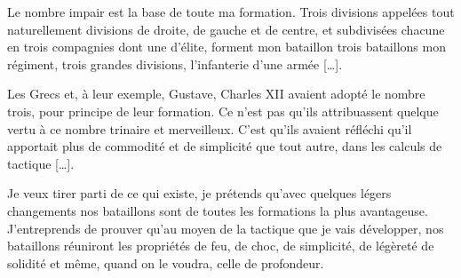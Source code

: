 \documentclass[french,twoside]{book} %
\begin{document}
Le nombre impair est la base de toute ma formation. Trois divisions appelées tout naturellement divisions de droite, de gauche et de centre, et subdivisées chacune en trois compagnies dont une d’élite, forment mon bataillon trois bataillons mon régiment, trois grandes divisions, l’infanterie d’une armée […].\par
Les Grecs et, à leur exemple, Gustave, Charles XII avaient adopté le nombre trois, pour principe de leur formation. Ce n’est pas qu’ils attribuassent quelque vertu à ce nombre trinaire et merveilleux. C’est qu’ils avaient réfléchi qu’il apportait plus de commodité et de simplicité que tout autre, dans les calculs de tactique […].\par
Je veux tirer parti de ce qui existe, je prétends qu’avec quelques légers changements nos bataillons sont de toutes les formations la plus avantageuse. J’entreprends de prouver qu’au moyen de la tactique que je vais développer, nos bataillons réuniront les propriétés de feu, de choc, de simplicité, de légèreté de solidité et même, quand on le voudra, celle de profondeur.
\end{document}
